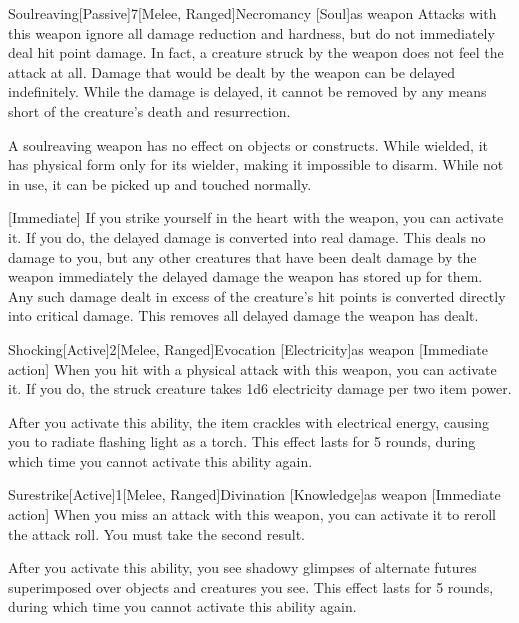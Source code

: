         \begin{magicitemdef}{Soulreaving}[Passive]{7}[Melee, Ranged]{Necromancy [Soul]}{as weapon}
             Attacks with this weapon ignore all damage reduction and hardness, but do not immediately deal hit point damage.
            In fact, a creature struck by the weapon does not feel the attack at all.
            Damage that would be dealt by the weapon can be delayed indefinitely.
            While the damage is delayed, it cannot be removed by any means short of the creature's death and resurrection.

            A soulreaving weapon has no effect on objects or constructs.
            While wielded, it has physical form only for its wielder, making it impossible to disarm.
            While not in use, it can be picked up and touched normally.

            [Immediate] If you strike yourself in the heart with the weapon, you can activate it.
            If you do, the delayed damage is converted into real damage.
            This deals no damage to you, but any other creatures that have been dealt damage by the weapon immediately the delayed damage the weapon has stored up for them.
            Any such damage dealt in excess of the creature's hit points is converted directly into critical damage.
            This removes all delayed damage the weapon has dealt.
        \end{magicitemdef}

        \begin{magicitemdef}{Shocking}[Active]{2}[Melee, Ranged]{Evocation [Electricity]}{as weapon}
            [Immediate action] When you hit with a physical attack with this weapon, you can activate it.
            If you do, the struck creature takes 1d6 electricity damage per two item power.

            After you activate this ability, the item crackles with electrical energy, causing you to radiate flashing light as a torch.
            This effect lasts for 5 rounds, during which time you cannot activate this ability again.
        \end{magicitemdef}

        \begin{magicitemdef}{Surestrike}[Active]{1}[Melee, Ranged]{Divination [Knowledge]}{as weapon}
            [Immediate action] When you miss an attack with this weapon, you can activate it to reroll the attack roll.
            You must take the second result.

            After you activate this ability, you see shadowy glimpses of alternate futures superimposed over objects and creatures you see.
            This effect lasts for 5 rounds, during which time you cannot activate this ability again.
        \end{magicitemdef}

